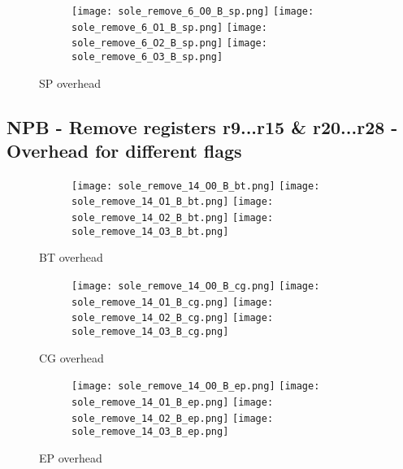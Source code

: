 \documentclass[11pt]{article}
\begin{document}
    \begin{figure}[!htb]
        \begin{subfigure}{\linewidth}
            \texttt{[image: sole\_remove\_6\_O0\_B\_sp.png]}
            \texttt{[image: sole\_remove\_6\_O1\_B\_sp.png]}
            \texttt{[image: sole\_remove\_6\_O2\_B\_sp.png]}
            \texttt{[image: sole\_remove\_6\_O3\_B\_sp.png]}
        \end{subfigure}\par\medskip
        \caption{SP overhead}
    \end{figure}

    \subsection*{NPB - Remove registers r9...r15 \& r20...r28 - Overhead for different flags}

    \begin{figure}[!htb]
        \begin{subfigure}{\linewidth}
            \texttt{[image: sole\_remove\_14\_O0\_B\_bt.png]}\hfill
            \texttt{[image: sole\_remove\_14\_O1\_B\_bt.png]}\hfill
            \texttt{[image: sole\_remove\_14\_O2\_B\_bt.png]}\hfill
            \texttt{[image: sole\_remove\_14\_O3\_B\_bt.png]}\hfill
        \end{subfigure}\par\medskip
        \caption{BT overhead}\label{fig:figure}
    \end{figure}

    \begin{figure}[!htb]
        \begin{subfigure}{\linewidth}
            \texttt{[image: sole\_remove\_14\_O0\_B\_cg.png]}\hfill
            \texttt{[image: sole\_remove\_14\_O1\_B\_cg.png]}\hfill
            \texttt{[image: sole\_remove\_14\_O2\_B\_cg.png]}\hfill
            \texttt{[image: sole\_remove\_14\_O3\_B\_cg.png]}\hfill
        \end{subfigure}\par\medskip
        \caption{CG overhead}\label{fig:figure2}
    \end{figure}
\begin{figure}[!htb]
        \begin{subfigure}{\linewidth}
            \texttt{[image: sole\_remove\_14\_O0\_B\_ep.png]}\hfill
            \texttt{[image: sole\_remove\_14\_O1\_B\_ep.png]}\hfill
            \texttt{[image: sole\_remove\_14\_O2\_B\_ep.png]}\hfill
            \texttt{[image: sole\_remove\_14\_O3\_B\_ep.png]}\hfill
        \end{subfigure}\par\medskip
        \caption{EP overhead}\label{fig:figure3}
\end{figure}
\end{document}
